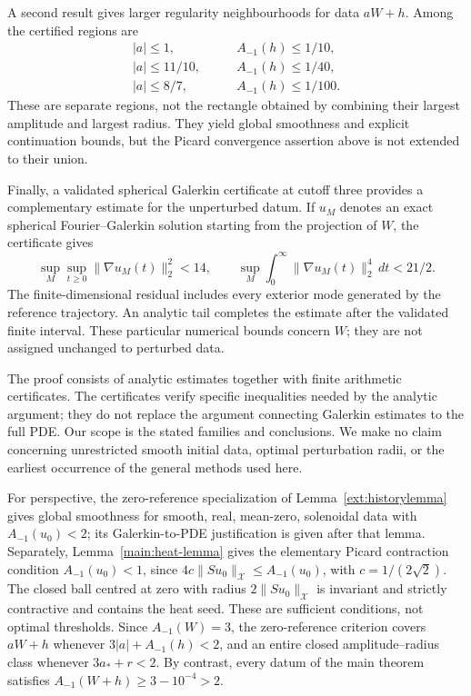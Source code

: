 A second result gives larger regularity neighbourhoods for data \(aW+h\). Among the certified regions are
\[
 \begin{split}
  |a|\le1,&\qquad A_{-1}(h)\le1/10,\\
  |a|\le11/10,&\qquad A_{-1}(h)\le1/40,\\
  |a|\le8/7,&\qquad A_{-1}(h)\le1/100.
 \end{split}
\]
These are separate regions, not the rectangle obtained by combining their largest amplitude and largest radius. They yield global smoothness and explicit continuation bounds, but the Picard convergence assertion above is not extended to their union.

Finally, a validated spherical Galerkin certificate at cutoff three provides a complementary estimate for the unperturbed datum. If \(u_M\) denotes an exact spherical Fourier--Galerkin solution starting from the projection of \(W\), the certificate gives
\[
 \sup_M\sup_{t\ge0}\|\nabla u_M(t)\|_2^2<14,
 \qquad
 \sup_M\int_0^\infty\|\nabla u_M(t)\|_2^4\,dt<21/2.
\]
The finite-dimensional residual includes every exterior mode generated by the reference trajectory. An analytic tail completes the estimate after the validated finite interval. These particular numerical bounds concern \(W\); they are not assigned unchanged to perturbed data.

The proof consists of analytic estimates together with finite arithmetic certificates. The certificates verify specific inequalities needed by the analytic argument; they do not replace the argument connecting Galerkin estimates to the full PDE. Our scope is the stated families and conclusions. We make no claim concerning unrestricted smooth initial data, optimal perturbation radii, or the earliest occurrence of the general methods used here.

For perspective, the zero-reference specialization of Lemma~\ref{ext:historylemma} gives global smoothness for smooth, real, mean-zero, solenoidal data with \(A_{-1}(u_0)<2\); its Galerkin-to-PDE justification is given after that lemma. Separately, Lemma~\ref{main:heat-lemma} gives the elementary Picard contraction condition \(A_{-1}(u_0)<1\), since \(4c\|Su_0\|_{\mathcal X}\le A_{-1}(u_0)\), with \(c=1/(2\sqrt2)\). The closed ball centred at zero with radius \(2\|Su_0\|_{\mathcal X}\) is invariant and strictly contractive and contains the heat seed. These are sufficient conditions, not optimal thresholds. Since \(A_{-1}(W)=3\), the zero-reference criterion covers \(aW+h\) whenever \(3|a|+A_{-1}(h)<2\), and an entire closed amplitude--radius class whenever \(3a_*+r<2\). By contrast, every datum of the main theorem satisfies \(A_{-1}(W+h)\ge3-10^{-4}>2\).

